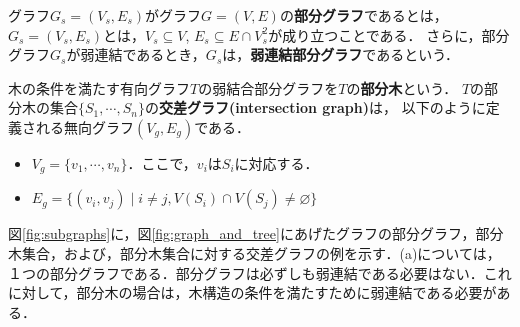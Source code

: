 \documentclass[a4j,dvipdfmx]{jbook}
\begin{document}
グラフ$G_s=(V_s,E_s)$がグラフ$G=(V,E)$の{\bf 部分グラフ}であるとは，
$G_s=(V_s,E_s)$とは，$V_s\subseteq V$,
$E_s\subseteq E\cap V_s^2$が成り立つことである．
さらに，部分グラフ$G_s$が弱連結であるとき，$G_s$は，{\bf 弱連結部分グラフ}であるという．

木の条件を満たす有向グラフ$T$の弱結合部分グラフを$T$の{\bf 部分木}という．
$T$の部分木の集合$\{S_1,\cdots,S_n\}$の{\bf 交差グラフ(intersection graph)}は，
以下のように定義される無向グラフ$(V_g,E_g)$である．
\begin{itemize}
  \item $V_g=\{v_1,\cdots,v_n\}$．ここで，$v_i$は$S_i$に対応する．
  \item $E_g=\{(v_i,v_j)\;|\;i\not=j,V(S_i)\cap V(S_j)\not=\varnothing\}$
\end{itemize}

図\ref{fig:subgraphs}に，図\ref{fig:graph_and_tree}にあげたグラフの部分グラフ，部分木集合，および，部分木集合に対する交差グラフの例を示す．(a)については，１つの部分グラフである．部分グラフは必ずしも弱連結である必要はない．これに対して，部分木の場合は，木構造の条件を満たすために弱連結である必要がある．
\end{document}
